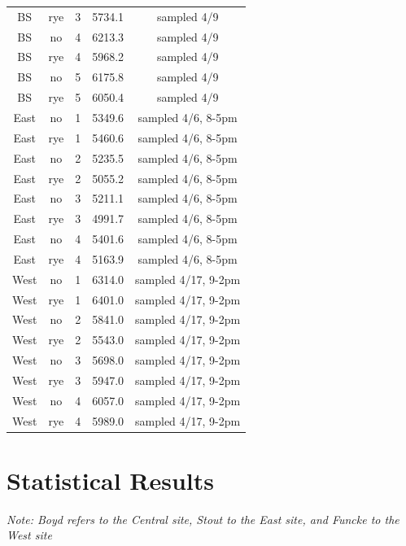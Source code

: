 \documentclass[]{article}
\begin{document}
\begin{table}[H]
\begin{tabular}[t]{ccccc}
\rowcolor{gray!6}  BS & rye & 3 & 5734.1 & sampled 4/9\\
\addlinespace
BS & no & 4 & 6213.3 & sampled 4/9\\
\rowcolor{gray!6}  BS & rye & 4 & 5968.2 & sampled 4/9\\
BS & no & 5 & 6175.8 & sampled 4/9\\
\rowcolor{gray!6}  BS & rye & 5 & 6050.4 & sampled 4/9\\
East & no & 1 & 5349.6 & sampled 4/6, 8-5pm\\
\addlinespace
\rowcolor{gray!6}  East & rye & 1 & 5460.6 & sampled 4/6, 8-5pm\\
East & no & 2 & 5235.5 & sampled 4/6, 8-5pm\\
\rowcolor{gray!6}  East & rye & 2 & 5055.2 & sampled 4/6, 8-5pm\\
East & no & 3 & 5211.1 & sampled 4/6, 8-5pm\\
\rowcolor{gray!6}  East & rye & 3 & 4991.7 & sampled 4/6, 8-5pm\\
\addlinespace
East & no & 4 & 5401.6 & sampled 4/6, 8-5pm\\
\rowcolor{gray!6}  East & rye & 4 & 5163.9 & sampled 4/6, 8-5pm\\
West & no & 1 & 6314.0 & sampled 4/17, 9-2pm\\
\rowcolor{gray!6}  West & rye & 1 & 6401.0 & sampled 4/17, 9-2pm\\
West & no & 2 & 5841.0 & sampled 4/17, 9-2pm\\
\addlinespace
\rowcolor{gray!6}  West & rye & 2 & 5543.0 & sampled 4/17, 9-2pm\\
West & no & 3 & 5698.0 & sampled 4/17, 9-2pm\\
\rowcolor{gray!6}  West & rye & 3 & 5947.0 & sampled 4/17, 9-2pm\\
West & no & 4 & 6057.0 & sampled 4/17, 9-2pm\\
\rowcolor{gray!6}  West & rye & 4 & 5989.0 & sampled 4/17, 9-2pm\\
\bottomrule
\end{tabular}
\end{table}

\newpage

\hypertarget{statistical-results}{%
\section{Statistical Results}\label{statistical-results}}

\emph{Note: Boyd refers to the Central site, Stout to the East site, and
Funcke to the West site}
\end{document}
